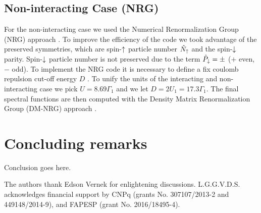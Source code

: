\documentclass[showpacs,aps,prb,reprint,superscriptaddress]{revtex4-1}
\begin{document}

%

\subsection{Non-interacting Case (NRG)}
For the non-interacting case we used the Numerical Renormalization Group (NRG) approach \cite{wilson_renormalization_1975,sindel_numerical_2005,bulla_numerical_2008}. 
 To  improve the efficiency of the code we took advantage of the preserved symmetries, which are  spin-$\uparrow$ particle number $\hat{N}_\uparrow$ and the spin-$\downarrow$ parity. Spin-$\downarrow$ particle number is not preserved due to the term $\hat{P}_\downarrow = \pm $ ($+$ even, $-$ odd). To implement the NRG code it is necessary to define a fix coulomb repulsion cut-off energy $D$ \cite{bulla_numerical_2008}. To unify the units of the interacting and non-interacting case we pick $U=8.69\Gamma_1$ and we let $D = 2U_1=17.3 \Gamma_1$.  The final spectral functions are then computed with the Density Matrix Renormalization Group (DM-NRG) approach \cite{hofstetter_generalized_2000}. 
 
 
 












    
\section{Concluding remarks}
\label{sec:Conclusions}

Conclusion goes here.

\begin{acknowledgments}
The authors thank Edson Vernek for enlightening discussions.  L.G.G.V.D.S. acknowledges financial support by CNPq (grants No. 307107/2013-2 and 449148/2014-9), and FAPESP (grant No. 2016/18495-4).
\end{acknowledgments}
\end{document}
